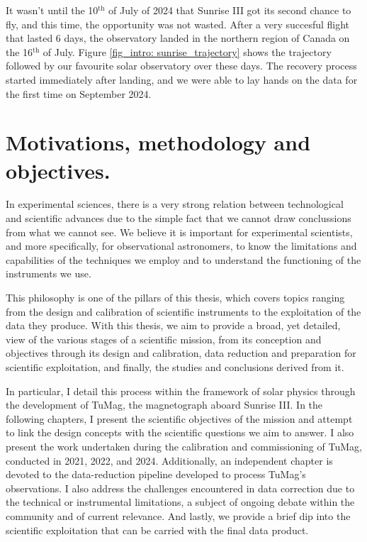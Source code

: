 It wasn't until the 10$^{\text{th}}$ of July of 2024 that Sunrise III got its second chance to fly, and this time, the opportunity was not wasted. After a very succesful flight that lasted 6 days, the observatory landed in the northern region of Canada on the 16$^{\text{th}}$ of July. Figure \ref{fig_intro: sunrise_trajectory} shows the trajectory followed by our favourite solar observatory over these days. The recovery process started immediately after landing, and we were able to lay hands on the data for the first time on September 2024. 

\section{Motivations, methodology and objectives.}

In experimental sciences, there is a very strong relation between technological and scientific advances due to the simple fact that we cannot draw conclussions from what we cannot see. We believe it is important for experimental scientists, and more specifically, for observational astronomers, to know the limitations and capabilities of the techniques we employ and to understand the functioning of the instruments we use. 

This philosophy is one of the pillars of this thesis, which covers topics ranging from the design and calibration of scientific instruments to the exploitation of the data they produce. With this thesis, we aim to provide a broad, yet detailed, view of the various stages of a scientific mission, from its conception and objectives through its design and calibration, data reduction and preparation for scientific exploitation, and finally, the studies and conclusions derived from it.

In particular, I detail this process within the framework of solar physics through the development of TuMag, the magnetograph aboard Sunrise III. In the following chapters, I present the scientific objectives of the mission and attempt to link the design concepts with the scientific questions we aim to answer. I also present the work undertaken during the calibration and commissioning of TuMag, conducted in 2021, 2022, and 2024. Additionally, an independent chapter is devoted to the data-reduction pipeline developed to process TuMag's observations. I also address the challenges encountered in data correction due to the technical or instrumental limitations, a subject of ongoing debate within the community and of current relevance. And lastly, we provide a brief dip into the scientific exploitation that can be carried with the final data product. 


